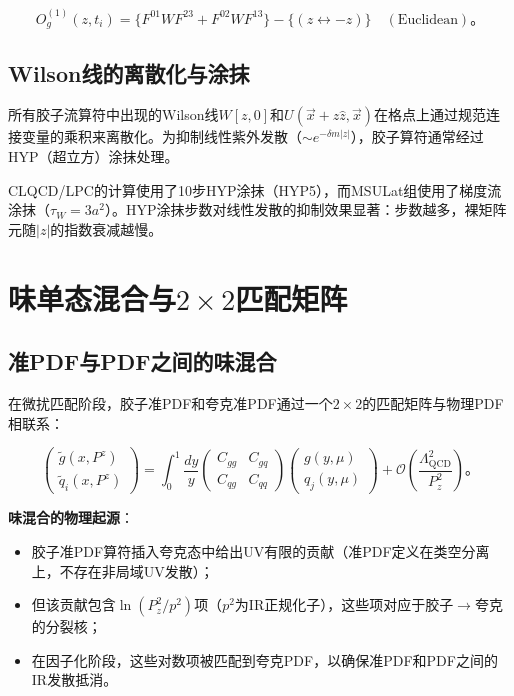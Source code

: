 \documentclass[12pt,a4paper]{ctexart}
\theoremstyle{definition}
\begin{document}
\begin{equation}
O^{(1)}_g(z, t_i) = \{F^{01}W F^{23} + F^{02}W F^{13}\} - \{ (z \leftrightarrow -z) \} \quad (\text{Euclidean})。
\label{eq:pol_Og1}
\end{equation}

\subsection{Wilson线的离散化与涂抹}

所有胶子流算符中出现的Wilson线$W[z,0]$和$U(\vec{x}+z\hat{z}, \vec{x})$在格点上通过规范连接变量的乘积来离散化。为抑制线性紫外发散（$\sim e^{-\delta m|z|}$），胶子算符通常经过HYP（超立方）涂抹处理\cite{Chen2025gluon,NoteGluonPDFs}。

CLQCD/LPC的计算使用了10步HYP涂抹（HYP5），而MSULat组使用了梯度流涂抹（$\tau_W = 3a^2$）\cite{NieMiera2025}。HYP涂抹步数对线性发散的抑制效果显著：步数越多，裸矩阵元随$|z|$的指数衰减越慢。

\section{味单态混合与$2\times2$匹配矩阵}

\subsection{准PDF与PDF之间的味混合}

在微扰匹配阶段，胶子准PDF和夸克准PDF通过一个$2\times2$的匹配矩阵与物理PDF相联系\cite{Zhang2019,Yao2023}：

\begin{equation}
\begin{pmatrix} \tilde{g}(x, P^z) \\ \tilde{q}_i(x, P^z) \end{pmatrix} =
\int_0^1 \frac{dy}{y}
\begin{pmatrix} C_{gg} & C_{gq} \\ C_{qg} & C_{qq} \end{pmatrix}
\begin{pmatrix} g(y, \mu) \\ q_j(y, \mu) \end{pmatrix} + \mathcal{O}\left(\frac{\Lambda^2_{\text{QCD}}}{P_z^2}\right)。
\label{eq:2x2_matching}
\end{equation}

\textbf{味混合的物理起源}\cite{Zhang2019,Li2018multiplicative}：

\begin{itemize}
    \item 胶子准PDF算符插入夸克态中给出UV有限的贡献（准PDF定义在类空分离上，不存在非局域UV发散）；
    \item 但该贡献包含$\ln(P^2_z/p^2)$项（$p^2$为IR正规化子），这些项对应于胶子$\to$夸克的分裂核；
    \item 在因子化阶段，这些对数项被匹配到夸克PDF，以确保准PDF和PDF之间的IR发散抵消。
\end{itemize}
\end{document}
